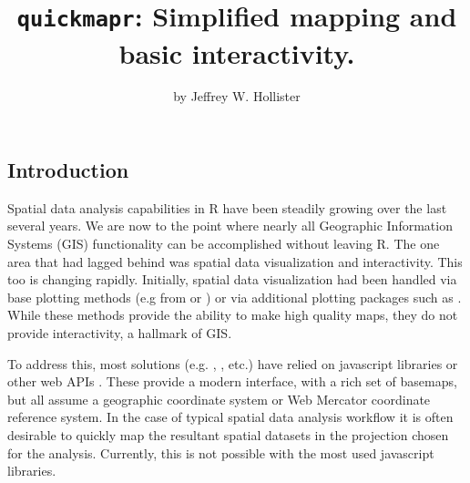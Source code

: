 \title{\texttt{quickmapr}: Simplified mapping and basic interactivity.}
\author{by Jeffrey W. Hollister}

\maketitle


\subsection{Introduction}\label{introduction}

Spatial data analysis capabilities in R have been steadily growing over
the last several years. We are now to the point where nearly all
Geographic Information Systems (GIS) functionality can be accomplished
without leaving R. The one area that had lagged behind was spatial data
visualization and interactivity. This too is changing rapidly.
Initially, spatial data visualization had been handled via base plotting
methods (e.g from  or ) or via additional
plotting packages such as
\citep{pebesma2005classes, bivand2013asdar, raster, ggplot2}.
While these methods provide the ability to make high quality maps, they
do not provide interactivity, a hallmark of GIS.

To address this, most solutions (e.g. ,
,  etc.) have relied on javascript
libraries or other web APIs \citep{ggmap, leaflet, mapview}. These
provide a modern interface, with a rich set of basemaps, but all assume
a geographic coordinate system or Web Mercator coordinate reference
system. In the case of typical spatial data analysis workflow it is
often desirable to quickly map the resultant spatial datasets in the
projection chosen for the analysis. Currently, this is not possible with
the most used javascript libraries.

